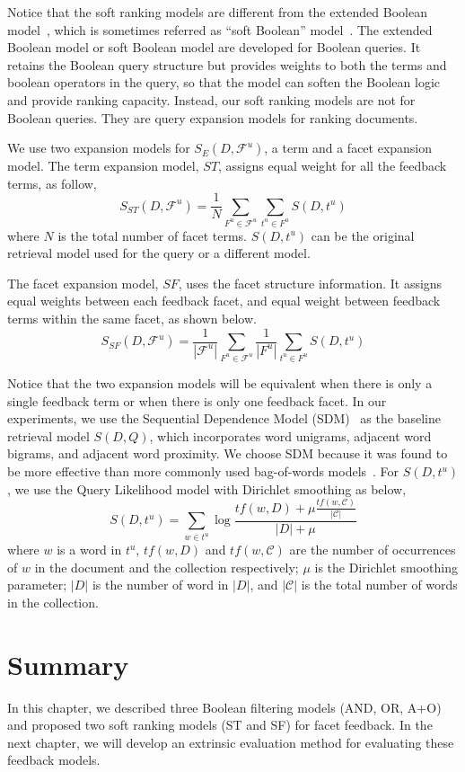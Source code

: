 Notice that the soft ranking models are different from the extended Boolean model~\cite{salton1983extended}, which is sometimes referred as ``soft Boolean'' model~\cite{kwok1993retrieval}. The extended Boolean model or soft Boolean model are developed for Boolean queries. It retains the Boolean query structure but provides weights to both the terms and boolean operators in the query, so that the model can soften the Boolean logic and provide ranking capacity. Instead, our soft ranking models are not for Boolean queries. They are query expansion models for ranking documents.

We use two expansion models for $S_E(D,\mathcal{F}^u)$, a term and a facet expansion model. The term expansion model, $ST$, assigns equal weight for all the feedback terms, as follow,
\begin{equation}
S_{ST}(D,\mathcal{F}^u) = \frac{1}{N}\sum_{F^u\in\mathcal{F}^u}{\sum_{t^u\in F^u}{S(D,t^u)}}
\end{equation}
where $N$ is the total number of facet terms. $S(D,t^u)$ can be the original retrieval model used for the query or a different model.

The facet expansion model, $SF$, uses the facet structure information. It assigns equal weights between each feedback facet, and equal weight between feedback terms within the same facet, as shown below.
\begin{equation}
S_{SF}(D,\mathcal{F}^u) = \frac{1}{|\mathcal{F}^u|} \sum_{F^u \in \mathcal{F}^u}{ \frac{1}{|F^u|} \sum_{t^u \in F^u}{S(D, t^u)}}
\end{equation}

Notice that the two expansion models will be equivalent when there is only a single feedback term or when there is only one feedback facet. In our experiments, we use the Sequential Dependence Model (SDM)~\cite{metzler2005markov} as the baseline retrieval model $S(D,Q)$, which incorporates word unigrams, adjacent word bigrams, and adjacent word proximity. We choose SDM because it was found to be more effective than more commonly used bag-of-words models~\cite{huston2014comparison}. For $S(D,t^u)$, we use the Query Likelihood model with Dirichlet smoothing as below,
\begin{equation}
S(D,t^u)=\sum_{w\in t^u}{\log\frac{tf(w,D)+\mu\frac{tf(w,\mathcal{C})}{|\mathcal{C}|}}{|D|+\mu}}
\end{equation}
where $w$ is a word in $t^u$, $tf(w,D)$ and $tf(w,\mathcal{C})$ are the number of occurrences of $w$ in the document and the collection respectively; $\mu$ is the Dirichlet smoothing parameter; $|D|$ is the number of word in $|D|$, and $|\mathcal{C}|$ is the total number of words in the collection.

\section{Summary}
In this chapter, we described three Boolean filtering models (AND, OR, A+O) and proposed two soft ranking models (ST and SF) for facet feedback. In the next chapter, we will develop an extrinsic evaluation method for evaluating these feedback models.